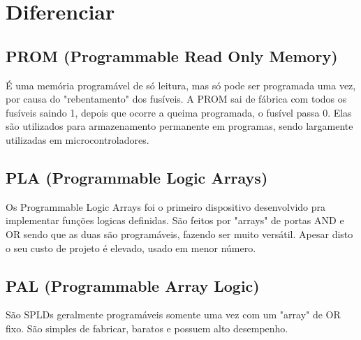 \section{\esp Diferenciar}
\subsection{PROM (Programmable Read Only Memory)}
É uma memória programável de só leitura, mas só pode ser programada uma vez, por causa do "rebentamento" dos fusíveis.
A PROM sai de fábrica com todos os fusíveis saindo 1, depois que ocorre a queima programada, o fusível passa 0.
Elas são utilizados para armazenamento permanente em programas, sendo largamente utilizadas em microcontroladores.

\subsection{PLA (Programmable Logic Arrays)}
Os Programmable Logic Arrays foi o primeiro dispositivo desenvolvido pra implementar funções logicas definidas.
São feitos por "arrays" de portas AND e OR sendo que as duas são programáveis, fazendo ser muito versátil.
Apesar disto o seu custo de projeto é elevado, usado em menor número.


\subsection{PAL (Programmable Array Logic)}
São SPLDs geralmente programáveis somente uma vez com um "array" de OR fixo.
São simples de fabricar, baratos e possuem alto desempenho.

